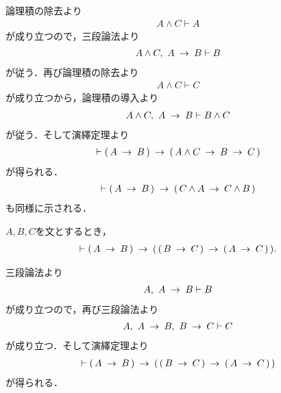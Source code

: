 	\begin{sketch}
		論理積の除去より
		\begin{align}
			A \wedge C \vdash A
		\end{align}
		が成り立つので，三段論法より
		\begin{align}
			A \wedge C,\ A \rarrow B \vdash B
		\end{align}
		が従う．再び論理積の除去より
		\begin{align}
			A \wedge C \vdash C
		\end{align}
		が成り立つから，論理積の導入より
		\begin{align}
			A \wedge C,\ A \rarrow B \vdash B \wedge C
		\end{align}
		が従う．そして演繹定理より
		\begin{align}
			\vdash (\, A \rarrow B\, ) \rarrow (\, A \wedge C \rarrow B \rarrow C\, )
		\end{align}
		が得られる．
		\begin{align}
			\vdash (\, A \rarrow B\, ) \rarrow (\, C \wedge A \rarrow C \wedge B\, )
		\end{align}
		も同様に示される．
		\QED
	\end{sketch}
	
	\begin{screen}
		\begin{logicalthm}[含意の含意への遺伝性]
		\label{logicalthm:heredity_of_implication_to_implication}
			$A,B,C$を文とするとき，
			\begin{align}
				\vdash (\, A \rarrow B\, ) \rarrow (\, (\, B \rarrow C\, )
				\rarrow (\, A \rarrow C\, )\, ).
			\end{align}
		\end{logicalthm}
	\end{screen}
	
	\begin{sketch}
		三段論法より
		\begin{align}
			A,\ A \rarrow B \vdash B
		\end{align}
		が成り立つので，再び三段論法より
		\begin{align}
			A,\ A \rarrow B,\ B \rarrow C \vdash C
		\end{align}
		が成り立つ．そして演繹定理より
		\begin{align}
			\vdash (\, A \rarrow B\, ) \rarrow (\, (\, B \rarrow C\, )
			\rarrow (\, A \rarrow C\, )\, )
		\end{align}
		が得られる．
		\QED
	\end{sketch}
	
